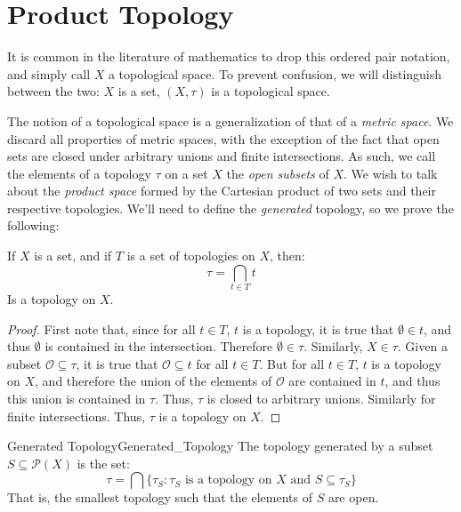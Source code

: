 \section{Product Topology}
    It is common in the literature of mathematics to drop this
    ordered pair notation, and simply call $X$ a topological space.
    To prevent confusion, we will distinguish between the two:
    $X$ is a set, $(X,\tau)$ is a topological space.
    \par\hfill\par
    The notion of a topological space is a generalization of that
    of a \textit{metric space}. We discard all properties of
    metric spaces, with the exception of the fact that open sets
    are closed under arbitrary unions and finite intersections.
    As such, we call the elements of a topology $\tau$ on a set
    $X$ the \textit{open subsets} of $X$. We wish to talk about
    the \textit{product space} formed by the Cartesian product of
    two sets and their respective topologies. We'll need to define
    the \textit{generated} topology, so we prove the following:
    \begin{theorem}
        \label{thm:Intersec_of_Tops_is_Top}%
        If $X$ is a set, and if $T$ is a set of topologies
        on $X$, then:
        \begin{equation}
            \tau=\bigcap_{t\in{T}}t
        \end{equation}
        Is a topology on $X$.
    \end{theorem}
    \begin{proof}
        First note that, since for all $t\in{T}$, $t$ is a topology,
        it is true that $\emptyset\in{t}$, and thus $\emptyset$ is
        contained in the intersection. Therefore $\emptyset\in\tau$.
        Similarly, $X\in\tau$. Given a subset
        $\mathcal{O}\subseteq\tau$, it is true that
        $\mathcal{O}\subseteq{t}$ for all $t\in{T}$. But for all
        $t\in{T}$, $t$ is a topology on $X$, and therefore the union
        of the elements of $\mathcal{O}$ are contained in $t$, and
        thus this union is contained in $\tau$. Thus, $\tau$ is
        closed to arbitrary unions. Similarly for finite
        intersections. Thus, $\tau$ is a topology on $X$.
    \end{proof}
    \begin{ldefinition}{Generated Topology}{Generated_Topology}
        The topology generated by a subset $S\subseteq\mathcal{P}(X)$
        is the set:
        \begin{equation}
            \tau=\bigcap\{\tau_{S}:\tau_{S}
                \textrm{ is a topology on $X$ and }
                S\subseteq\tau_{S}\}
        \end{equation}
        That is, the smallest topology such that the elements of $S$
        are open.
    \end{ldefinition}

